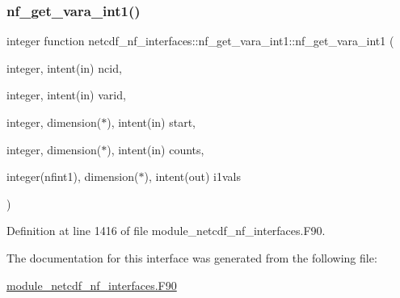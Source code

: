 \subsubsection{\texorpdfstring{nf\+\_\+get\+\_\+vara\+\_\+int1()}{nf\_get\_vara\_int1()}}
{\footnotesize\ttfamily integer function netcdf\+\_\+nf\+\_\+interfaces\+::nf\+\_\+get\+\_\+vara\+\_\+int1\+::nf\+\_\+get\+\_\+vara\+\_\+int1 (\begin{DoxyParamCaption}\item[{integer, intent(in)}]{ncid,  }\item[{integer, intent(in)}]{varid,  }\item[{integer, dimension($\ast$), intent(in)}]{start,  }\item[{integer, dimension($\ast$), intent(in)}]{counts,  }\item[{integer(nfint1), dimension($\ast$), intent(out)}]{i1vals }\end{DoxyParamCaption})}



Definition at line 1416 of file module\+\_\+netcdf\+\_\+nf\+\_\+interfaces.\+F90.



The documentation for this interface was generated from the following file\+:\begin{DoxyCompactItemize}
\item 
\hyperlink{module__netcdf__nf__interfaces_8F90}{module\+\_\+netcdf\+\_\+nf\+\_\+interfaces.\+F90}\end{DoxyCompactItemize}
